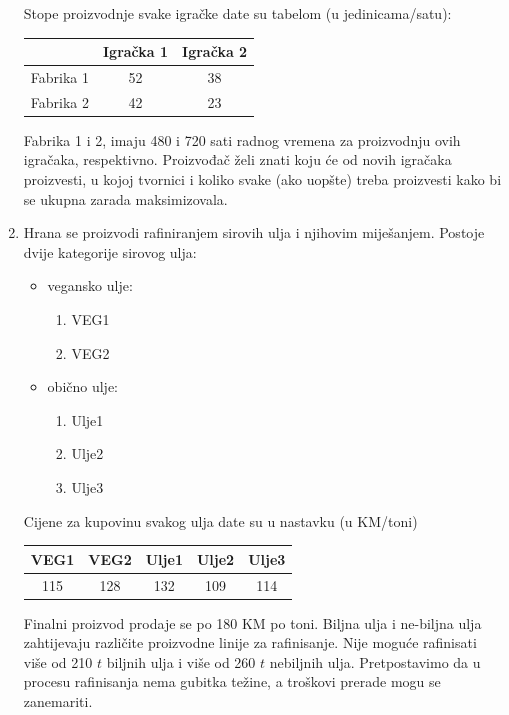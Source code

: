 \documentclass[a4paper, utf8, 11pt, colorlinks]{book}
\theoremstyle{definition}
\begin{document}
\begin{enumerate}
 
 Stope proizvodnje svake igračke date su tabelom (u jedinicama/satu): 
  \begin{table}[H]
 	\centering
 	\begin{tabular}{l|cc} \hline
 		  \        &  Igračka 1 & Igračka 2 \\ \hline
 	Fabrika 1   &  52     &  38     \\
    Fabrika 2   &  42     &  23     \\	\hline
 	\end{tabular} 
 \end{table}
 Fabrika 1 i 2, imaju 480 i 720 sati radnog vremena za proizvodnju ovih igračaka, respektivno. Proizvođač želi znati koju će od novih igračaka proizvesti, u kojoj tvornici i koliko svake (ako uopšte) treba proizvesti kako bi se ukupna zarada maksimizovala. 
 \item %
 Hrana se proizvodi rafiniranjem sirovih ulja i njihovim miješanjem. Postoje dvije kategorije sirovog ulja: 
 \begin{itemize}
 	\item vegansko ulje:
 	\begin{enumerate}
 		\item VEG1
 		\item VEG2 
 	\end{enumerate}
   \item obično ulje:
   \begin{enumerate}
   	\item Ulje1
   	\item Ulje2 
   	\item Ulje3
   \end{enumerate}
 \end{itemize}
Cijene za kupovinu svakog ulja date su u nastavku (u KM/toni)
\begin{table}[H]
 	\centering
 	\begin{tabular}{ccccc}
            VEG1 & VEG2 & Ulje1 & Ulje2 & Ulje3 \\ \hline
            115  & 128  & 132   & 109   & 114 \\ 	\hline	
    \end{tabular} 
\end{table}
Finalni proizvod prodaje se po 180 KM po toni. Biljna ulja i ne-biljna ulja zahtijevaju različite proizvodne linije za rafinisanje. Nije moguće rafinisati više od 210 $t$ biljnih ulja i više od 260 $t$ nebiljnih ulja. Pretpostavimo da u procesu rafinisanja nema gubitka težine, a troškovi prerade mogu se zanemariti. 


\end{enumerate}
\end{document}
